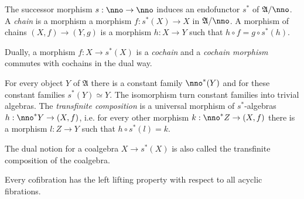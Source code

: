 \documentclass{tac}
\newcommand\hide[1]{}
\newcommand\ri{^*}
\newcommand\of{:}
\newcommand\ambient{\mathfrak A}
\begin{document}
\begin{definition} The successor morphism $s\of\nno\to\nno$ induces an endofunctor $s\ri$ of $\ambient/\nno$. A \emph{chain} is a morphism a morphism $f\of s\ri(X)\to X$ in $\ambient/\nno$.  A morphism of chains $(X,f)\to(Y,g)$ is a morphism $h\of X\to Y$ such that $h\circ f = g\circ s\ri(h)$.

Dually, a morphism $f\of X\to s\ri(X)$ is a \emph{cochain} and a \emph{cochain morphism} commutes with cochains in the dual way.

For every object $Y$ of $\ambient$ there is a constant family $\nno\ri(Y)$ and for these constant families $s\ri(Y)\simeq Y$. The isomorphism turn constant families into trivial algebras. The \emph{transfinite composition} is a universal morphism of $s\ri$-algebras $h\of \nno\ri Y\to (X,f)$, i.e. for every other morphism $k\of \nno\ri Z\to (X,f)$ there is a morphism $l\of Z\to Y$ such that $h\circ s\ri(l)=k$.

The dual notion for a coalgebra $X\to s\ri(X)$ is also called the transfinite composition of the coalgebra.
\end{definition}\hide{Every isomorphism-algebra is a constant family.}

\hide{Every isomorphism is injective. Moreover, the filler operators for the new injectives are functions of the existing filler operators, which are represented by natural transformations of internal functors.
\[
\xy
(0,12)*+{\bullet}="a",(12,12)*+{\bullet}="b",(24,12)*+{\bullet}="c",
(0,0)*+{\bullet}="d",(12,0)*+{\bullet}="e",(24,0)*+{\bullet}="f",
\ar "a";"b" \ar "b";"c" \ar "a";"d" \ar^(.6){g\ri(f)} "b";"e" \ar^f "c";"f" \ar "d";"e" \ar_g "e";"f"
\ar@{.>} "d";"c" \ar@{.>} "d";"b"
\endxy
\xy
(0,12)*+{\bullet}="a",(12,12)*+{\bullet}="b",(12,6)*+{\bullet}="c",(0,0)*+{\bullet}="d",(12,0)*+{\bullet}="e"
\ar "a";"b" \ar "a";"d" \ar "b";"c" \ar "c";"e" \ar "d";"e" \ar@{.>} "d";"b" \ar@{.>} "d";"c"
\endxy
\]
}

\begin{lemma} Every cofibration has the left lifting property with respect to all acyclic fibrations. \label{Reedy}\end{lemma}
\end{document}
